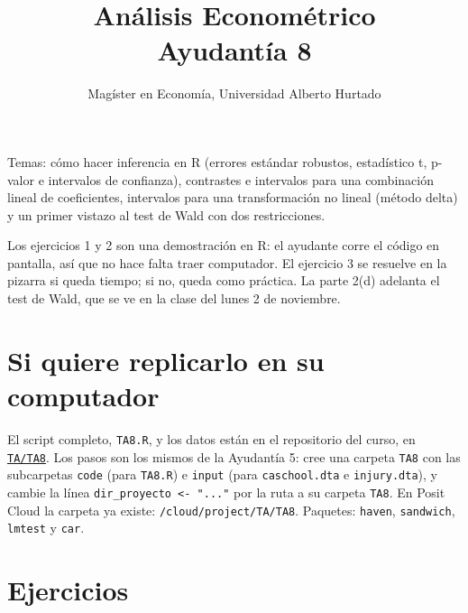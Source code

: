 \documentclass[letterpaper,11pt]{article}
\title{Análisis Econométrico \\ Ayudantía 8}
\author{Magíster en Economía, Universidad Alberto Hurtado}
\date{}
\begin{document}
\maketitle

\noindent Temas: cómo hacer inferencia en R (errores estándar robustos, estadístico t,
p-valor e intervalos de confianza), contrastes e intervalos para una combinación lineal de
coeficientes, intervalos para una transformación no lineal (método delta) y un
primer vistazo al test de Wald con dos restricciones.

\medskip
\noindent Los ejercicios 1 y 2 son una demostración en R: el ayudante corre el código en
pantalla, así que no hace falta traer computador. El ejercicio 3 se resuelve en la pizarra si
queda tiempo; si no, queda como práctica. La parte 2(d) adelanta el test de Wald, que se ve en la
clase del lunes 2 de noviembre.

\section*{Si quiere replicarlo en su computador}

\noindent El script completo, \texttt{TA8.R}, y los datos están en el repositorio del curso,
en \href{https://github.com/ramirode/econometria_mae/tree/main/TA/TA8}{\texttt{TA/TA8}}. Los
pasos son los mismos de la Ayudantía 5: cree una carpeta \texttt{TA8} con las subcarpetas
\texttt{code} (para \texttt{TA8.R}) e \texttt{input} (para \texttt{caschool.dta} e
\texttt{injury.dta}), y cambie la
línea \texttt{dir\_proyecto <- "..."} por la ruta a su carpeta \texttt{TA8}. En Posit Cloud la
carpeta ya existe: \texttt{/cloud/project/TA/TA8}. Paquetes: \texttt{haven},
\texttt{sandwich}, \texttt{lmtest} y \texttt{car}.

\section*{Ejercicios}
\end{document}
